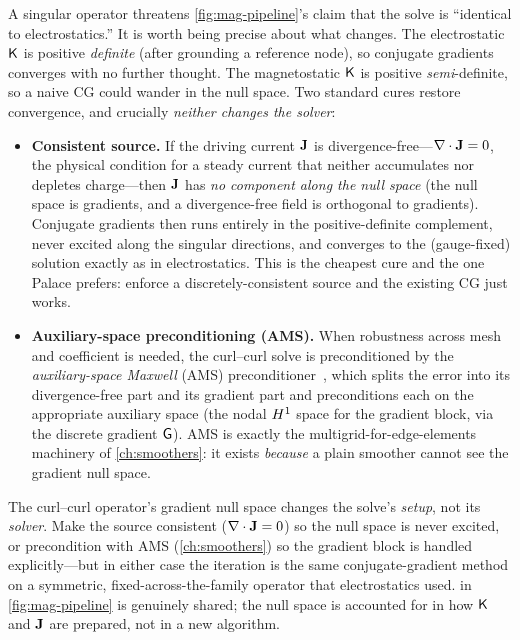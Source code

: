 A singular operator threatens \cref{fig:mag-pipeline}'s claim that the solve is
``identical to electrostatics.'' It is worth being precise about what changes. The
electrostatic $\mathsf{K}$ is positive \emph{definite} (after grounding a reference
node), so conjugate gradients converges with no further thought. The magnetostatic
$\mathsf{K}$ is positive \emph{semi}-definite, so a naive CG could wander in the null
space. Two standard cures restore convergence, and crucially \emph{neither changes
the solver}:

\begin{itemize}[nosep]
\item \textbf{Consistent source.} If the driving current $\mathbf{J}$ is
  divergence-free---$\nabla\cdot\mathbf{J}=0$, the physical condition for a steady current that
  neither accumulates nor depletes charge---then $\mathbf{J}$ has \emph{no component along
  the null space} (the null space is gradients, and a divergence-free field is
  orthogonal to gradients). Conjugate gradients then runs entirely in the
  positive-definite complement, never excited along the singular directions, and
  converges to the (gauge-fixed) solution exactly as in electrostatics. This is the
  cheapest cure and the one Palace prefers: enforce a discretely-consistent source
  and the existing CG just works.
\item \textbf{Auxiliary-space preconditioning (AMS).} When robustness across mesh
  and coefficient is needed, the curl--curl solve is preconditioned by the
  \emph{auxiliary-space Maxwell} (AMS) preconditioner~\citep{hiptmair1998}, which
  splits the error into its divergence-free part and its gradient part and
  preconditions each on the appropriate auxiliary space (the nodal $H^1$ space for
  the gradient block, via the discrete gradient $\mathsf{G}$). AMS is exactly the
  multigrid-for-edge-elements machinery of \cref{ch:smoothers}: it exists
  \emph{because} a plain smoother cannot see the gradient null space.
\end{itemize}

\begin{keyidea}
The curl--curl operator's gradient null space changes the solve's \emph{setup}, not
its \emph{solver}. Make the source consistent ($\nabla\cdot\mathbf{J}=0$) so the null space is
never excited, or precondition with AMS (\cref{ch:smoothers}) so the gradient block
is handled explicitly---but in either case the iteration is the same
conjugate-gradient method on a symmetric, fixed-across-the-family operator that
electrostatics used.  in \cref{fig:mag-pipeline} is genuinely
shared; the null space is accounted for in how $\mathsf{K}$ and $\mathbf{J}$ are prepared, not
in a new algorithm.
\end{keyidea}

